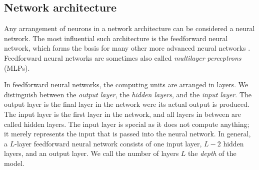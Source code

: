 \begin{comment}
One common activation function is the \emph{logistic sigmoid}:

\begin{equation}
\sigma(x) = \frac1{1+e^{-x}}.
\end{equation}

\begin{figure}
	\begin{center}
		
	\end{center}
	\caption{The logistic sigmoid function.}
	\label{fig:sigmoid}
\end{figure}

As shown in Fig. \ref{fig:sigmoid}, $\sigma(x)$ squashes the output to a value between 0 and 1. A very similar function, producing an output between -1 and 1, is $\tanh(x)$. Lastly, one of the most commonly used activation functions is the \emph{rectified linear} function $g(x) = \max\{0,x\}$ plotted in Fig. \ref{fig:relu}.

\begin{figure}
	\begin{center}
		
	\end{center}
	\caption{The rectified linear function.}
	\label{fig:relu}
\end{figure}

The choice of activation function is an important design decision that can greatly influence how well the model learns. The rectified linear function is a very good default choice, as it has shown to outperform other functions in a variety of different model architectures \cite{DBLP:journals/jmlr/GlorotBB11 ,DBLP:conf/nips/KrizhevskySH12}. We will see why some functions work better than others in Section \ref{sec:training}.
\end{comment}

\subsection{Network architecture}
Any arrangement of neurons in a network architecture can be considered a neural network. The most influential such architecture is the feedforward neural network, which forms the basis for many other more advanced neural networks \cite[Ch.\,6,\,p.\,163]{DBLP:books/daglib/0040158}. Feedforward neural networks are sometimes also called \emph{multilayer perceptrons} (MLPs).

In feedforward neural networks, the computing units are arranged in layers. We distinguish between the \emph{output layer}, the \emph{hidden layers}, and the \emph{input layer}. The output layer is the final layer in the network were its actual output is produced. The input layer is the first layer in the network, and all layers in between are called hidden layers. The input layer is special as it does not compute anything; it merely represents the input that is passed into the neural network. In general, a $L$-layer feedforward neural network consists of one input layer, $L-2$ hidden layers, and an output layer. We call the number of layers $L$ the \emph{depth} of the model.

